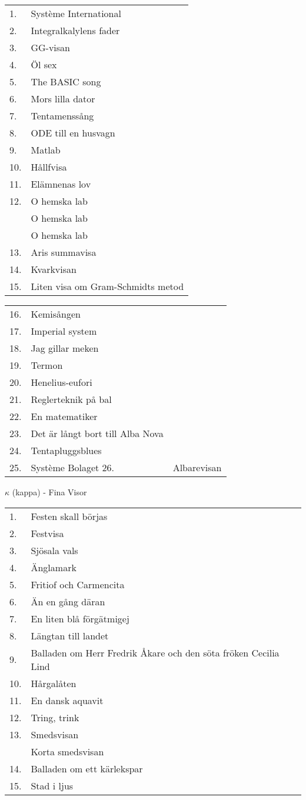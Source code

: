 \documentclass[a6paper,10pt]{article}
\begin{document}
\noindent
\normalsize
\begin{tabularx}{1\textwidth}{l X}
1.&Système International\\
2.&Integralkalylens fader\\
3.&GG-visan\\
4.&Öl sex\\
5.&The BASIC song\\
6.&Mors lilla dator\\
7.&Tentamenssång\\
8.&ODE till en husvagn\\
9.&Matlab\\
10.&Hållfvisa\\
11.&Elämnenas lov\\
12.&O hemska lab\\
&O hemska lab\\
&O hemska lab\\
13.&Aris summavisa\\
14.&Kvarkvisan\\
15.&Liten visa om Gram-Schmidts metod\\
\end{tabularx}

\noindent
\begin{tabularx}{1\textwidth}{l X}
16.&Kemisången\\
17.&Imperial system\\
18.&Jag gillar meken\\
19.&Termon\\
20.&Henelius-eufori\\
21.&Reglerteknik på bal\\
22.&En matematiker\\
23.&Det är långt bort till Alba Nova\\
24.&Tentapluggsblues\\
25.&Système Bolaget
26.&Albarevisan
\end{tabularx}

\vspace{5pt}

\noindent \Large $\kappa$ (kappa) - Fina Visor

\noindent
\normalsize
\begin{tabularx}{1\textwidth}{l X}
1.&Festen skall börjas\\
2.&Festvisa\\
3.&Sjösala vals\\
4.&Änglamark\\
5.&Fritiof och Carmencita\\
6.&Än en gång däran\\
7.&En liten blå förgätmigej\\
8.&Längtan till landet\\
9.&Balladen om Herr Fredrik Åkare och den söta fröken Cecilia
Lind\\
10.&Hårgalåten\\
11.&En dansk aquavit\\
12.&Tring, trink\\
13.&Smedsvisan\\
&Korta smedsvisan\\
14.&Balladen om ett kärlekspar\\
15.&Stad i ljus
\end{tabularx}
\end{document}
